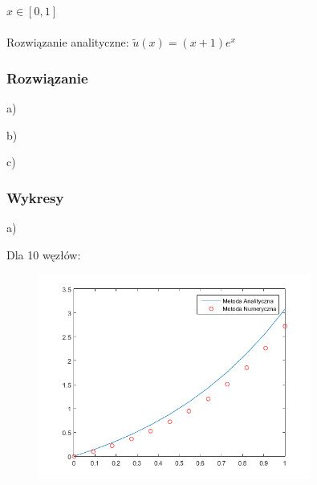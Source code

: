 $x\in [0,1]$
\\
\\
Rozwiązanie analityczne: $\widetilde{u}(x) = (x+1)e^x$

\subsubsection{Rozwiązanie}


\begin{samepage}
a)

\end{samepage}
\newpage
\begin{samepage}
b)

\end{samepage}
\newpage
\begin{samepage}
c)

\end{samepage}

\newpage

\subsubsection{Wykresy}

a)\\
\begin{samepage}
	Dla 10 węzłów:
	

	\FloatBarrier
	\begin{figure}[!ht]
		\begin{center}
			\includegraphics[width=0.8\textwidth]{Lab4/charts/zad4/1/10.png}
		\end{center}
	\end{figure}
	\FloatBarrier
\end{samepage}

